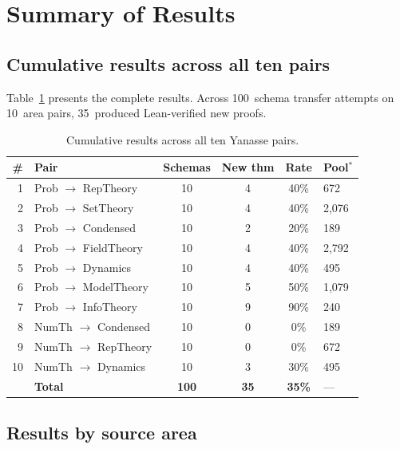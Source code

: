 \documentclass[11pt]{article}
\theoremstyle{definition}
\theoremstyle{remark}
\begin{document}
\section{Summary of Results}\label{sec:results}

\subsection{Cumulative results across all ten pairs}

Table~\ref{tab:cumulative} presents the complete results.  Across
100~schema transfer attempts on 10~area pairs, 35~produced
Lean-verified new proofs.

\begin{table}[ht]
\centering\small
\caption{Cumulative results across all ten Yanasse pairs.}
\label{tab:cumulative}
\begin{tabular}{@{}rlcccl@{}}
\toprule
\# & Pair & Schemas & New thm & Rate & Pool$^*$ \\
\midrule
1 & Prob $\to$ RepTheory
  & 10 & 4 & 40\% & 672 \\
2 & Prob $\to$ SetTheory
  & 10 & 4 & 40\% & 2{,}076 \\
3 & Prob $\to$ Condensed
  & 10 & 2 & 20\% & 189 \\
4 & Prob $\to$ FieldTheory
  & 10 & 4 & 40\% & 2{,}792 \\
5 & Prob $\to$ Dynamics
  & 10 & 4 & 40\% & 495 \\
6 & Prob $\to$ ModelTheory
  & 10 & 5 & 50\% & 1{,}079 \\
7 & Prob $\to$ InfoTheory
  & 10 & 9 & 90\% & 240 \\
8 & NumTh $\to$ Condensed
  & 10 & 0 & 0\% & 189 \\
9 & NumTh $\to$ RepTheory
  & 10 & 0 & 0\% & 672 \\
10 & NumTh $\to$ Dynamics
  & 10 & 3 & 30\% & 495 \\
\midrule
& \textbf{Total} & \textbf{100} & \textbf{35} & \textbf{35\%}
  & --- \\
\bottomrule
\end{tabular}

\smallskip{}
\end{table}

\subsection{Results by source area}
\end{document}
